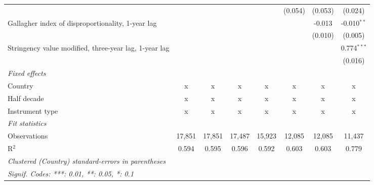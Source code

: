 \begin{table}[htbp]
\begin{tabular}{lccccccc}
                                                            &              &              &              &              & (0.054)       & (0.053)       & (0.024)\\   
      Gallagher index of disproportionality, 1-year lag     &              &              &              &              &               & -0.013        & -0.010$^{**}$\\   
                                                            &              &              &              &              &               & (0.010)       & (0.005)\\   
      Stringency value modified, three-year lag, 1-year lag &              &              &              &              &               &               & 0.774$^{***}$\\   
                                                            &              &              &              &              &               &               & (0.016)\\   
      \emph{Fixed effects}\\
      Country                                               & x            & x            & x            & x            & x             & x             & x\\  
      Half decade                                           & x            & x            & x            & x            & x             & x             & x\\  
      Instrument type                                       & x            & x            & x            & x            & x             & x             & x\\  
      \midrule \emph{Fit statistics}\\
      Observations                                          & 17,851       & 17,851       & 17,487       & 15,923       & 12,085        & 12,085        & 11,437\\  
      R$^2$                                                 & 0.594        & 0.595        & 0.596        & 0.592        & 0.603         & 0.603         & 0.779\\  
      \midrule
      \multicolumn{8}{l}{\emph{Clustered (Country) standard-errors in parentheses}}\\
      \multicolumn{8}{l}{\emph{Signif. Codes: ***: 0.01, **: 0.05, *: 0.1}}\\
   \end{tabular}
\end{table}



